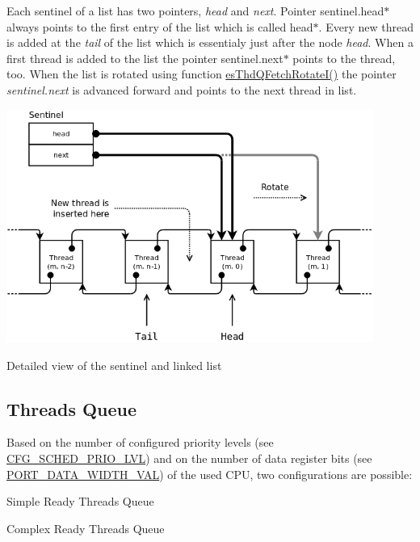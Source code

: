 Each sentinel of a list has two pointers, {\itshape head} and {\itshape next}. Pointer sentinel.\-head$\ast$ always points to the first entry of the list which is called head$\ast$. Every new thread is added at the {\itshape tail} of the list which is essentialy just after the node {\itshape head}. When a first thread is added to the list the pointer sentinel.\-next$\ast$ points to the thread, too. When the list is rotated using function \hyperlink{group__kern__intf_gae365b14292f1496a90d876baec84fb4e}{es\-Thd\-Q\-Fetch\-Rotate\-I()} the pointer {\itshape sentinel.\-next} is advanced forward and points to the next thread in list.


\begin{DoxyImage}
\includegraphics[width=12cm]{thdL-rotate.png}
\caption{Detailed view of the sentinel and linked list}
\end{DoxyImage}
\hypertarget{scheduler_sched_thdQ}{}\subsection{Threads Queue}\label{scheduler_sched_thdQ}
Based on the number of configured priority levels (see \hyperlink{group__template__kern__cfg_ga56bd89fe76f7fe22f3d8805bc3c68892}{C\-F\-G\-\_\-\-S\-C\-H\-E\-D\-\_\-\-P\-R\-I\-O\-\_\-\-L\-V\-L}) and on the number of data register bits (see \hyperlink{group__template__cpu__intf_gac4d9e19c50315dec7721d4bc4d6b0605}{P\-O\-R\-T\-\_\-\-D\-A\-T\-A\-\_\-\-W\-I\-D\-T\-H\-\_\-\-V\-A\-L}) of the used C\-P\-U, two configurations are possible\-:
\begin{DoxyItemize}
\item Simple Ready Threads Queue
\item Complex Ready Threads Queue
\end{DoxyItemize}


